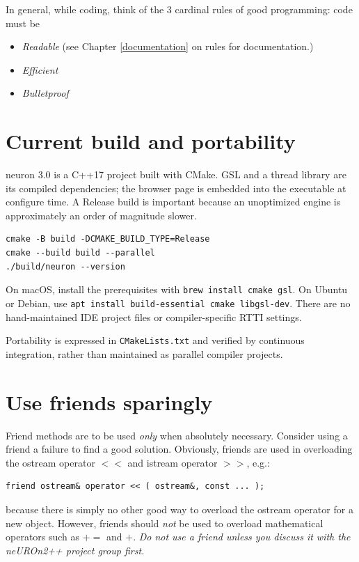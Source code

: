 \documentclass{report}
\begin{document}
In general, while coding, think of the 3 cardinal rules of good
programming: code must be
\begin{itemize}
\item {\em Readable} (see Chapter \ref{documentation} on rules for
      documentation.)
\item {\em Efficient}
\item {\em Bulletproof}
\end{itemize}

\section{Current build and portability}

neuron 3.0 is a C++17 project built with CMake.  GSL and a thread
library are its compiled dependencies; the browser page is embedded
into the executable at configure time.  A Release build is important
because an unoptimized engine is approximately an order of magnitude
slower.

\begin{verbatim}
cmake -B build -DCMAKE_BUILD_TYPE=Release
cmake --build build --parallel
./build/neuron --version
\end{verbatim}

On macOS, install the prerequisites with
\texttt{brew install cmake gsl}.  On Ubuntu or Debian, use
\texttt{apt install build-essential cmake libgsl-dev}.  There are no
hand-maintained IDE project files or compiler-specific RTTI settings.

Portability is expressed in \texttt{CMakeLists.txt} and verified by
continuous integration, rather than maintained as parallel compiler
projects.

\section{Use friends sparingly}

Friend methods are to be used {\em only} when absolutely necessary.
Consider using a friend a failure to find a good solution.  Obviously,
friends are used in overloading the ostream operator $<<$ and istream
operator $>>$,
e.g.:
\begin{verbatim}
friend ostream& operator << ( ostream&, const ... );
\end{verbatim}
because there is simply no other good way to overload the ostream
operator for a new object.  However, friends should {\em not} be used
to overload mathematical operators such as $+=$ and $+$.  {\em Do not
use a friend unless you discuss it with the neUROn2++ project group
first.}
\end{document}
